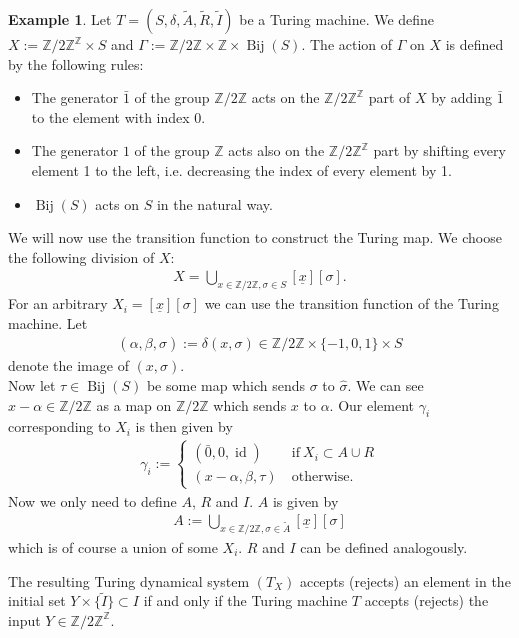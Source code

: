 \documentclass[12pt,a4paper]{scrartcl}
\theoremstyle{plain}
\theoremstyle{definition}
\newtheorem{Example}[Theorem]{Example}
\newcommand{\Z}{\mathbb{Z}} %
\newcommand{\2}{\mathbb{Z} / 2 \mathbb{Z}}
\newcommand{\1}{\bar{1}}
\newcommand{\0}{\bar{0}}
\newcommand{\Bij}{\operatorname{Bij}}
\newcommand{\id}{\operatorname{id}}
\begin{document}
\begin{Example}\label{TMtoTDS}
	Let  $T=(S,\delta, \tilde{A}, \tilde{R}, \tilde{I})$ be a Turing machine. We define $X := \2^\Z \times S$ and $\Gamma := \2 \times \Z \times \Bij(S)$.
	The action of $\Gamma$ on $X$ is defined by the following rules:
	\begin{itemize}
		\item The generator $\1$ of the group $\Z / 2\Z$ acts on the $\Z / 2\Z^\Z$ part of $X$ by adding $\1$ to the element with index $0$.
		\item The generator $1$ of the group $\Z$ acts also on the $\Z / 2\Z^\Z$ part by shifting every element 1 to the left, i.e. decreasing the index of every element by 1.
		\item $\Bij(S)$ acts on $S$ in the natural way.
	\end{itemize}
	We will now use the transition function to construct the Turing map. We choose the following division of $X$:
	\begin{align*}
	X = \bigcup_{x \in \2, \sigma \in S} [\underline{x}][\sigma].
	\end{align*}
	For an arbitrary $X_i = [\underline{x}][\sigma]$ we can use the transition function of the Turing machine. Let
	\begin{align*}
		(\alpha, \beta,\hat{\sigma}) := \delta(x, \sigma) \in \2 \times \{-1, 0, 1\} \times S
	\end{align*} 
	denote  the image of $(x, \sigma)$. \\
	Now let $\tau \in \Bij(S)$ be some map which sends $\sigma$ to $\hat{\sigma}$. We can see $x-\alpha \in \2$ as a map on $\2$ which sends $x$ to $\alpha$. Our element $\gamma_i$ corresponding to $X_i$ is then given by 
	\begin{align*}
		\gamma_i := \begin{cases}
			(\0, 0, \id) & ~\text{if}~ X_i \subset A \cup R \\
			(x-\alpha, \beta, \tau) & ~\text{otherwise.}
		\end{cases}
	\end{align*} 
	Now we only need to define $A$, $R$ and $I$. $A$ is given by
	\begin{align*}
	A := \bigcup_{x \in \2, \sigma \in \tilde{A}}[\underline{x}][\sigma]
	\end{align*}
	which is of course a union of some $X_i$. $R$ and $I$ can be defined analogously. 
	
	The resulting Turing dynamical system $(T_X)$ accepts (rejects) an element in the initial set $Y \times \{\tilde{I}\} \subset I$ if and only if the Turing machine $T$ accepts (rejects) the input $Y \in \2^\Z$.
\end{Example} 
\end{document}
